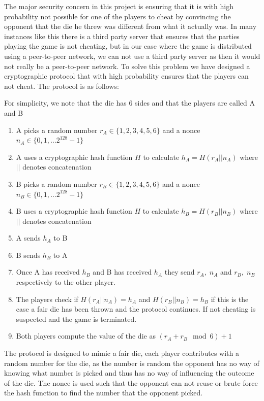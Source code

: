 \documentclass[ twoside,openright,titlepage,numbers=noenddot,headinclude,%
                footinclude=true,cleardoublepage=empty,abstractoff, %
                BCOR=5mm,paper=a4,fontsize=11pt,%
                ngerman,american,%
                ]{scrreprt}
\begin{document}
The major security concern in this project is ensuring that it is with high probability not possible for one of the players to cheat by convincing the opponent that the die he threw was different from what it actually was. In many instances like this there is a third party server that ensures that the parties playing the game is not cheating, but in our case where the game is distributed using a peer-to-peer network, we can not use a third party server as then it would not really be a peer-to-peer network. To solve this problem we have designed a cryptographic protocol that with high probability ensures that the players can not cheat. The protocol is as follows: 

For simplicity, we note that the die has 6 sides and that the players are called A and B
\begin{enumerate}
  \item A picks a random number $r_A \in \{1,2,3,4,5,6\}$ and a nonce $n_A \in \{0,1,\dots 2^{128}-1\}$
  \item A uses a cryptographic hash function $H$ to calculate $h_A = H(r_A || n_A)$ where $||$ denotes concatenation
  \item B picks a random number $r_B \in \{1,2,3,4,5,6\}$ and a nonce $n_B \in \{0,1,\dots 2^{128}-1\}$
  \item B uses a cryptographic hash function $H$ to calculate $h_B = H(r_B || n_B)$ where $||$ denotes concatenation 
  \item A sends $h_A$ to B
  \item B sends $h_B$ to A
  \item Once A has received $h_B$ and B has received $h_A$ they send $r_A, \; n_A$ and $r_B, \; n_B$ respectively to the other player.
  \item The players check if $H(r_A || n_A) = h_A$ and $H(r_B || n_B) = h_B$ if this is the case a fair die has been thrown and the protocol continues. If not cheating is suspected and the game is terminated.
  \item Both players compute the value of the die as $(r_A + r_B \mod 6) + 1$
\end{enumerate}
The protocol is designed to mimic a fair die, each player contributes with a random number for the die, as the number is random the opponent has no way of knowing what number is picked and thus has no way of influencing the outcome of the die. The nonce is used such that the opponent can not reuse or brute force the hash function to find the number that the opponent picked.
\end{document}

